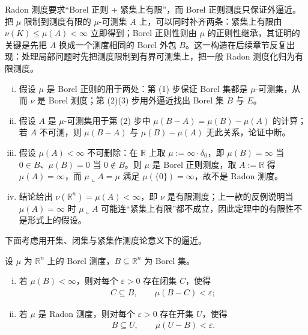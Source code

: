 \documentclass[../../main.tex]{subfiles}
\begin{document}
\begin{remark}\label{remark:ch01-thm-1-7-动机}
Radon 测度要求“Borel 正则 + 紧集上有限”，而 Borel 正则测度只保证外逼近。把 $\mu$ 限制到测度有限的 $\mu$-可测集 $A$ 上，可以同时补齐两条：紧集上有限由 $\nu(K)\leqslant\mu(A)<\infty$ 立即得到；Borel 正则性则由 $\mu$ 的正则性继承，其证明的关键是先把 $A$ 换成一个测度相同的 Borel 外包 $B$。这一构造在后续章节反复出现：处理局部问题时先把测度限制到有界可测集上，把一般 Radon 测度化归为有限测度。
\end{remark}

\begin{remark}\label{remark:ch01-thm-1-7-条件}
\begin{enumerate}[(i)]
\item 假设 $\mu$ 是 Borel 正则的用于两处：第 (1) 步保证 Borel 集都是 $\mu$-可测集，从而 $\nu$ 是 Borel 测度；第 (2)(3) 步用外逼近找出 Borel 集 $B$ 与 $E$。
\item 假设 $A$ 是 $\mu$-可测集用于第 (2) 步中 $\mu(B-A)=\mu(B)-\mu(A)$ 的计算；若 $A$ 不可测，则 $\mu(B-A)$ 与 $\mu(B)-\mu(A)$ 无此关系，论证中断。
\item 假设 $\mu(A)<\infty$ 不可删除：在 $\mathbb{R}$ 上取 $\mu:=\infty\cdot\delta_{0}$，即 $\mu(B)=\infty$ 当 $0\in B$、$\mu(B)=0$ 当 $0\notin B$。则 $\mu$ 是 Borel 正则测度，取 $A:=\mathbb{R}$ 得 $\mu(A)=\infty$，而 $\mu\llcorner A=\mu$ 满足 $\mu(\{0\})=\infty$，故不是 Radon 测度。
\item 结论给出 $\nu(\mathbb{R}^{n})=\mu(A)<\infty$，即 $\nu$ 是有限测度；上一款的反例说明当 $\mu(A)=\infty$ 时 $\mu\llcorner A$ 可能连“紧集上有限”都不成立，因此定理中的有限性不是形式上的假设。
\end{enumerate}
\end{remark}

下面考虑用开集、闭集与紧集作测度论意义下的逼近。

\begin{lemma}[用闭集与开集逼近]\label{lemma:ch01-1-1}
设 $\mu$ 为 $\mathbb{R}^{n}$ 上的 Borel 测度，$B\subseteq\mathbb{R}^{n}$ 为 Borel 集。
\begin{enumerate}[(i)]
\item 若 $\mu(B)<\infty$，则对每个 $\varepsilon>0$ 存在闭集 $C$，使得
\begin{align*}
C\subseteq B,\qquad\mu(B-C)<\varepsilon;
\end{align*}
\item 若 $\mu$ 是 Radon 测度，则对每个 $\varepsilon>0$ 存在开集 $U$，使得
\begin{align*}
B\subseteq U,\qquad\mu(U-B)<\varepsilon.
\end{align*}
\end{enumerate}
\end{lemma}
\end{document}
